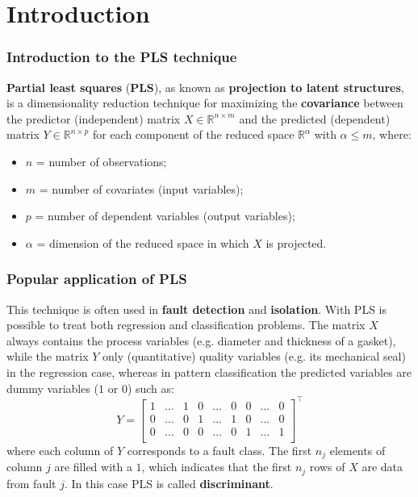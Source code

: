 \section{Introduction}

\begin{frame}
	\frametitle{Introduction to the PLS technique}
	\textbf{Partial least squares} (\textbf{PLS}), as known as \textbf{projection to latent structures}, is a dimensionality reduction technique for maximizing the \textbf{covariance} between the predictor (independent) matrix $X \in \mathbb{R}^{n \times m}$ and the predicted (dependent) matrix $Y \in \mathbb{R}^{n \times p}$ for each component of the reduced space $\mathbb{R}^\alpha$ with $\alpha \le m$, where:
	\begin{itemize}
		\item $n$ = number of observations;
		\item $m$ = number of covariates (input variables);
		\item $p$ = number of dependent variables (output variables);
		\item $\alpha$ = dimension of the reduced space in which $X$ is projected.
	\end{itemize}
\end{frame}

\begin{frame}
	\frametitle{Popular application of PLS}
	This technique is often used in \textbf{fault detection} and \textbf{isolation}. With PLS is possible to treat both regression and classification problems. The matrix $X$ always contains the process variables (e.g. diameter and thickness of a gasket), while the matrix $Y$ only (quantitative) quality variables (e.g. its mechanical seal) in the regression case, whereas in pattern classification the predicted variables are dummy variables ($1$ or $0$) such as:
	\begin{equation}
		Y = 
		\begin{bmatrix}
			1 & \dots & 1 & 0 & \dots & 0 & 0 & \dots & 0\\
			0 & \dots & 0 & 1 & \dots & 1 & 0 & \dots & 0\\
			0 & \dots & 0 & 0 & \dots & 0 & 1 & \dots & 1\\
		\end{bmatrix}^\top
	\end{equation}
	where each column of $Y$ corresponds to a fault class. The first $n_j$ elements of column $j$ are filled with a $1$, which indicates that the first $n_j$ rows of $X$ are data from fault $j$. In this case PLS is called \textbf{discriminant}.
\end{frame}